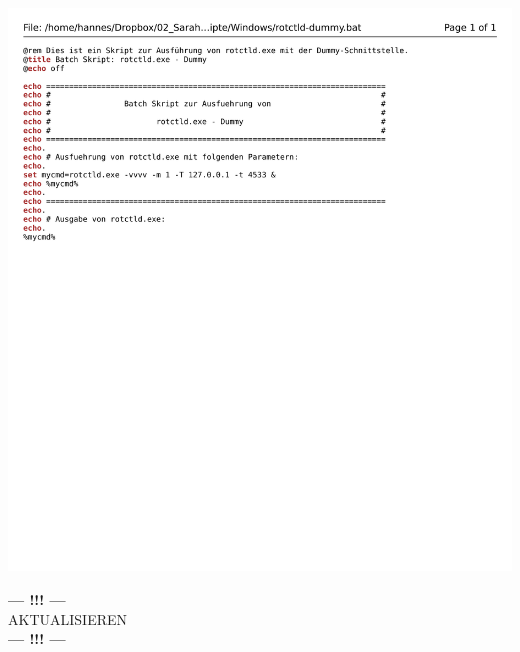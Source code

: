 \begin{center}
	\includegraphics[width=1\textwidth]{./appendicies/rotctld-dummy}
\end{center}

\begin{center}
	\Large{\textbf{--- !!! ---}\\AKTUALISIEREN\\\textbf{--- !!! ---}}
\end{center}

